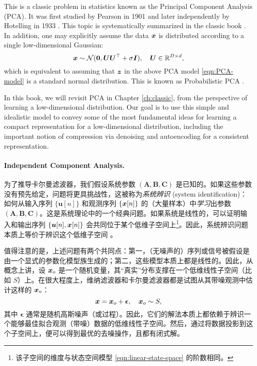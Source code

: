 \documentclass[../../book-main_zh.tex]{subfiles}
\begin{document}
This is a classic problem in statistics known as the Principal Component Analysis (PCA). It was first studied by Pearson in 1901 \cite{Pearson1901} and later independently by Hotelling in 1933 \cite{Hotelling1933}. This topic is systematically summarized in the classic book \cite{Jolliffe1986,JolliffeI2002}.
In addition, one may explicitly assume the data $\bm{x}$ is distributed according to a single low-dimensional Gaussian:
\begin{equation}
    \bm{x} \sim \mathcal{N}(\boldsymbol{0}, \boldsymbol{U}\boldsymbol{U}^\top + \sigma \bm{I}), \quad \boldsymbol{U} \in \mathbb{R}^{D\times d},
\end{equation}
which is equivalent to assuming that  $\bm{z}$ in the above PCA model \eqref{eqn:PCA-model} is a standard normal distribution. 
This is known as Probabilistic PCA \cite{TippingM1999}. 

In this book, we will revisit  PCA in Chapter \ref{ch:classic}, from the perspective of learning a low-dimensional distribution. Our goal is to use this simple and idealistic model to convey some of the most fundamental ideas for learning a compact representation for a low-dimensional distribution, including the important notion of compression via denoising and autoencoding for a consistent representation.

\paragraph{Independent Component Analysis.}

为了推导卡尔曼滤波器，我们假设系统参数 $(\boldsymbol{A}, \boldsymbol{B}, \boldsymbol{C})$ 是已知的。如果这些参数没有预先给定，问题将更具挑战性，这被称为{\em 系统辨识} (system identification)：如何从输入序列 $\{\boldsymbol{u}[n]\}$ 和观测序列 $\{\bm{x}[n]\}$ 的（大量样本）中{\em 学习}出参数 $(\boldsymbol{A}, \boldsymbol{B}, \boldsymbol{C})$。这是系统理论中的一个经典问题。如果系统是线性的，可以证明输入和输出序列 $\{\boldsymbol{u}[n], \bm{x}[n]\}$ 会共同位于某个低维子空间上\footnote{该子空间的维度与状态空间模型 \eqref{eqn:linear-state-space} 的阶数相同。}。因此，系统辨识问题本质上等价于辨识这个低维子空间 \cite{OverscheeP1996,Liu-2009-CDC,Liu-2010-SIAM}。

值得注意的是，上述问题有两个共同点：第一，（无噪声的）序列或信号被假设是由一个显式的参数化模型族生成的；第二，这些模型本质上都是线性的。因此，从概念上讲，设 $\bm{x}_o$ 是一个随机变量，其“真实”分布支撑在一个低维线性子空间（比如 $S$）上。在很大程度上，维纳滤波器和卡尔曼滤波器都是试图从其带噪观测中估计这样的 $\bm{x}_o$：
\begin{equation}
    \bm{x} = \bm{x}_o + \boldsymbol{\epsilon}, \quad \bm{x}_o \sim S, 
\end{equation}
其中 $\boldsymbol{\epsilon}$ 通常是随机高斯噪声（或过程）。因此，它们的解法本质上都依赖于辨识一个能够最佳拟合观测（带噪）数据的低维线性子空间。然后，通过将数据投影到这个子空间上，便可以得到最优的去噪操作，且都有闭式解。
\end{document}
